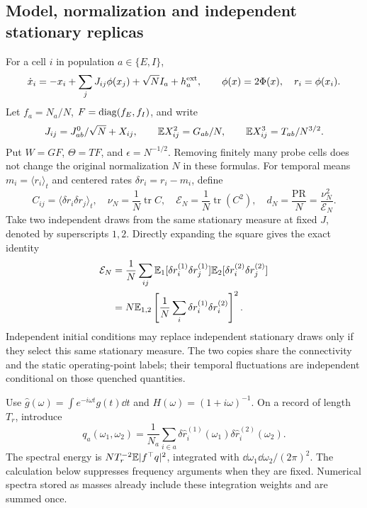 \subsection{Model, normalization and independent stationary replicas}
For a cell $i$ in population $a\in\{E,I\}$,
\[
 \dot x_i=-x_i+\sum_jJ_{ij}\phi(x_j)+\sqrt N I_a+h_a^{\rm ext},
 \qquad \phi(x)=2\Phi(x),\quad r_i=\phi(x_i).
\]
Let $f_a=N_a/N$, $F=\operatorname{diag}(f_E,f_I)$, and write
\[
 J_{ij}=J^0_{ab}/\sqrt N+X_{ij},\qquad
 \mathbb E X_{ij}^2=G_{ab}/N,\qquad
 \mathbb E X_{ij}^3=T_{ab}/N^{3/2}.
\]
Put $W=GF$, $\Theta=TF$, and $\epsilon=N^{-1/2}$. Removing finitely many
probe cells does not change the original normalization $N$ in these formulas.
For temporal means $m_i=\langle r_i\rangle_t$ and centered rates
$\delta r_i=r_i-m_i$, define
\[
 C_{ij}=\langle\delta r_i\delta r_j\rangle_t,\quad
 \nu_N=\frac1N\operatorname{tr}C,\quad
 \mathcal E_N=\frac1N\operatorname{tr}(C^2),\quad
 d_N=\frac{\mathrm{PR}}N=\frac{\nu_N^2}{\mathcal E_N}.
\]
Take two independent draws from the same stationary measure at fixed $J$,
denoted by superscripts $1,2$. Directly expanding the square gives the exact
identity
\begin{align*}
 \mathcal E_N
 &=\frac1N\sum_{ij}
   \mathbb E_1[\delta r_i^{(1)}\delta r_j^{(1)}]
   \mathbb E_2[\delta r_i^{(2)}\delta r_j^{(2)}]\\
 &=N\mathbb E_{1,2}\left[
       \frac1N\sum_i\delta r_i^{(1)}\delta r_i^{(2)}\right]^2.
\end{align*}
Independent initial conditions may replace independent stationary draws only
if they select this same stationary measure. The two copies share the
connectivity and the static operating-point labels; their temporal
fluctuations are independent conditional on those quenched quantities.

Use $\widehat g(\omega)=\int e^{-i\omega t}g(t)\dd t$ and
$H(\omega)=(1+i\omega)^{-1}$. On a record of length $T_r$, introduce
\[
 q_a(\omega_1,\omega_2)=\frac1{N_a}\sum_{i\in a}
   \delta\widehat r_i^{(1)}(\omega_1)
   \delta\widehat r_i^{(2)}(\omega_2).
\]
The spectral energy is $N T_r^{-2}\mathbb E|f^\top q|^2$, integrated with
$\dd\omega_1\dd\omega_2/(2\pi)^2$. The calculation below suppresses
frequency arguments when they are fixed. Numerical spectra stored as masses
already include these integration weights and are summed once.

